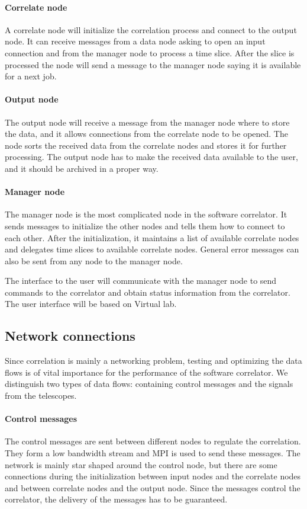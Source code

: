 \documentclass[12pt]{article}
\begin{document}
\paragraph{Correlate node}
A correlate node will initialize the correlation process and connect
to the output node. It can receive messages from a data node asking to
open an input connection and from the manager node to process a
time slice. After the slice is processed the node will send a message
to the manager node saying it is available for a next job.

\paragraph{Output node}
The output node will receive a message from the manager node where
to store the data, and it allows connections from the correlate node to
be opened. The node sorts the received data from the correlate nodes
and stores it for further processing. The output node has to make the
received data available to the user, and it should be archived in a
proper way.

\paragraph{Manager node}
The manager node is the most complicated node in the software
correlator. It sends messages to initialize the other nodes and tells
them how to connect to each other. After the initialization, it
maintains a list of available correlate nodes and delegates time
slices to available correlate nodes. General error messages can also
be sent from any node to the manager node.

The interface to the user will communicate with the manager node to
send commands to the correlator and obtain status information from the
correlator. The user interface will be based on Virtual lab.

\subsection{Network connections}
Since correlation is mainly a networking problem, testing and
optimizing the data flows is of vital importance for the performance
of the software correlator. We distinguish two types of data flows:
containing control messages and the signals from the telescopes. 

\paragraph{Control messages}
The control messages are sent between different nodes to regulate the
correlation. They form a low bandwidth stream and MPI is used to send
these messages. The network is mainly star shaped around the control
node, but there are some connections during the initialization between
input nodes and the correlate nodes and between correlate nodes and
the output node. Since the messages control the correlator, the
delivery of the messages has to be guaranteed.
\end{document}
